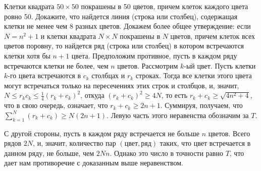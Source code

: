 \problem{}
Клетки квадрата $50 \times 50$ покрашены в 50 цветов, причем клеток каждого
цвета ровно 50.
Докажите, что найдется линия (строка или столбец), содержащая клетки не менее
чем 8 разных цветов.
\solution
Докажем более общее утверждение: если $N = n^2 + 1$ и клетки квадрата
$N \times N$ покрашены в $N$ цветов, причем клеток всех цветов поровну, то
найдется ряд (строка или столбец) в котором встречаются клетки хотя бы $n + 1$
цвета.
Предположим противное, пусть в каждом ряду встречаются клетки не более, чем $n$
цветов.
Рассмотрим $k$-ый цвет.
Пусть клетки $k$-го цвета встречаются в $c_k$ столбцах и $r_k$ строках.
Тогда все клетки этого цвета могут встречаться только на пересечениях этих
строк и столбцов, и, значит, $N \leq r_k c_k \leq \frac{1}{4}(r_k + c_k)^2$,
откуда $(r_k + c_k)^2 \geq 4 N$, то есть $r_k + c_k \geq \sqrt{4 n^2 + 4}$, что
в свою очередь, означает, что $r_k + c_k \geq 2 n + 1$.
Суммируя, получаем, что  $\sum_{k = 1}^N (r_k + c_k) \geq N(2 n + 1)$.
Левую часть этого неравенства обозначим за $T$.
\par
С другой стороны, пусть в каждом ряду встречается не больше $n$ цветов.
Всего рядов $2 N$, и, значит, количество пар $(\text{цвет}, \text{ряд})$
таких, что цвет встречается в данном ряду, не больше, чем $2 N n$.
Однако это число в точности равно $T$, что дает нам противоречие с доказанным
выше неравенством.
\endproblem
